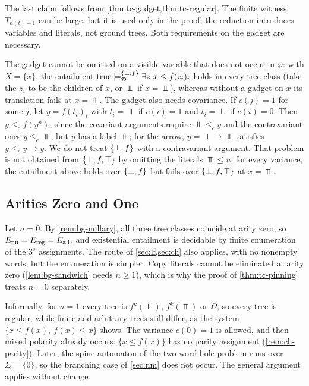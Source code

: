 The last claim follows from \cref{thm:tc-gadget,thm:tc-regular}. The finite
witness $T_{h(t)+1}$ can be large, but it is used only in the proof; the
reduction introduces variables and literals, not ground trees. Both
requirements on the gadget are necessary.

\begin{example}\label{rem:tc-gadget-needed}
The gadget cannot be omitted on a visible variable that does not occur in
$\varphi$: with $X=\{x\}$, the entailment
$\mathrm{true}\models^{\{\bot,f\}}_{\mathcal D}\exists\bar z\ x\le f(z_i)_i$ holds in
every tree class (take the $z_i$ to be the children of $x$, or $\Bot$ if
$x=\Bot$), whereas without a gadget on $x$ its translation fails at
$x=\Top$. The gadget also needs covariance. If $c(j)=1$ for some $j$, let
$y=f(t_i)_i$ with $t_i=\Top$ if $c(i)=1$ and $t_i=\Bot$ if $c(i)=0$. Then
$y\le_cf(y^n)$, since the covariant arguments require $\Bot\le_cy$ and the
contravariant ones $y\le_c\Top$, but $y$ has a label $\Top$; for the arrow,
$y=\Top\to\Bot$ satisfies $y\le_c y\to y$. We do not treat $\{\bot,f\}$ with a
contravariant argument. That problem is not obtained from $\{\bot,f,\top\}$ by omitting
the literals $\Top\le u$: for every variance, the entailment above holds over
$\{\bot,f\}$ but fails over $\{\bot,f,\top\}$ at $x=\Top$.
\end{example}

\subsection{Arities Zero and One}\label{sec:tc-small}

\begin{remark}\label{rem:tc-nullary}
Let $n=0$. By \cref{rem:bg-nullary}, all three tree classes coincide at arity
zero, so $E_{\mathrm{fin}}=E_{\mathrm{reg}}=E_{\mathrm{all}}$, and existential entailment is decidable by
finite enumeration of the $3^s$ assignments. The route of \cref{sec:lf,sec:ch} also applies, with
no nonempty words, but the enumeration is simpler. Copy literals cannot be
eliminated at arity zero (\cref{lem:bg-sandwich} needs $n\ge1$), which is why
the proof of \cref{thm:tc-pinning} treats $n=0$ separately.
\end{remark}

\begin{remark}\label{rem:tc-unary}
Informally, for $n=1$ every tree is $f^k(\Bot)$, $f^k(\Top)$ or $\Omega$, so
every tree is regular, while finite and arbitrary trees still differ, as the
system $\{x\le f(x),\ f(x)\le x\}$ shows. The variance $c(0)=1$ is allowed,
and then mixed polarity already occurs: $\{x\le f(x)\}$ has no parity
assignment (\cref{rem:ch-parity}). Later, the spine automaton of the two-word
hole problem runs over $\Sigma=\{0\}$, so the branching case of \cref{sec:nm}
does not occur. The general argument applies without change.
\end{remark}
